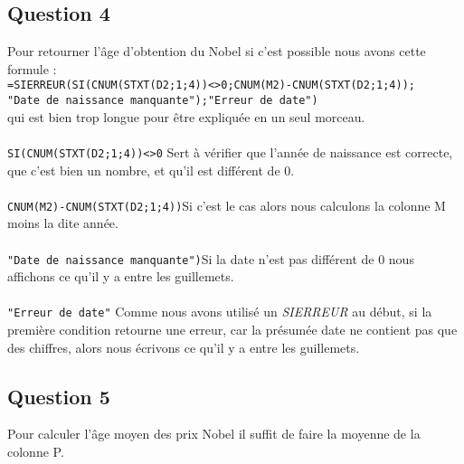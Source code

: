 \documentclass[10pt,a4paper]{article}
\begin{document}
\subsection{Question 4}
Pour retourner l'âge d’obtention du Nobel si c'est possible nous avons cette formule :\\
\verb|=SIERREUR(SI(CNUM(STXT(D2;1;4))<>0;CNUM(M2)-CNUM(STXT(D2;1;4));|\\\verb|"Date de naissance manquante");"Erreur de date")| \\
qui est bien trop longue pour être expliquée en un seul morceau.
\paragraph{}\verb|SI(CNUM(STXT(D2;1;4))<>0| Sert à vérifier que l'année de naissance est correcte, que c'est bien un nombre, et qu'il est différent de 0.
\paragraph{}\verb|CNUM(M2)-CNUM(STXT(D2;1;4))|Si c'est le cas alors nous calculons la colonne M moins la dite année. 
\paragraph{}\verb|"Date de naissance manquante")|Si la date n'est pas différent de 0 nous affichons ce qu'il y a entre les guillemets. 
\paragraph{}\verb|"Erreur de date"| Comme nous avons utilisé un \textit{SIERREUR} au début, si la première condition retourne une erreur, car la présumée date ne contient pas que des chiffres, alors nous écrivons ce qu'il y a entre les guillemets.
\subsection{Question 5}
Pour calculer l'âge moyen des prix Nobel il suffit de faire la moyenne de la colonne P.
\end{document}
